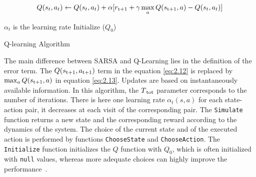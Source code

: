 \begin{equation}
\label{eq:2.13}
	Q(s_t, a_t) \leftarrow Q(s_t, a_t) + \alpha[r\textsubscript{t+1} + \gamma \max_{a} Q(s\textsubscript{t+1}, a) - Q(s_t, a_t)]
\end{equation} 

\begin{algorithm}
	$\alpha_t$ is the learning rate \;
	Initialize ($Q_0$)\;
\caption{Q-learning Algorithm ~\cite{Sigaud:2010:MDP:1841781}}
\end{algorithm}

The main difference between SARSA and Q-Learning lies in the definition of the error term. The $Q(s\textsubscript{t+1}, a\textsubscript{t+1})$ term in the equation \ref{eq:2.12}	is replaced by $\max_{a}Q(s\textsubscript{t+1}, a)$ in equation \ref{eq:2.13}. Updates are based on instantaneously available information. In this algorithm, the $T\textsubscript{tot}$ parameter corresponds to the number of iterations. There is here one learning rate $\alpha_t(s, a)$ for each state-action pair, it decreases at each visit of the corresponding  pair. The {\tt Simulate} function returns a new state and the corresponding reward according to the dynamics of the system. The choice of the current state and of the executed action is performed by functions {\tt ChooseState} and {\tt ChooseAction}. The {\tt Initialize} function initializes the $Q$ function with $Q_0$, which is often initialized with {\tt null} values, whereas more adequate choices can highly improve the performance~\cite{Sigaud:2010:MDP:1841781}.

